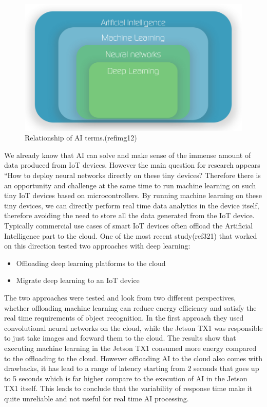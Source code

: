 \begin{figure}[!htb]
    \centering
    \includegraphics[width=1\textwidth]{figures/ai_classification.png}
    \caption{Relationship of AI terms.(refimg12)}
    \label{fig:ai_terms}
\end{figure}
We already know that AI can solve and make sense of the immense amount of data produced from IoT devices. However the main question for research appears “How to deploy neural networks directly on these tiny devices? Therefore there is an opportunity and challenge at the same time to run machine learning on such tiny IoT devices based on microcontrollers. By running machine learning on these tiny devices, we can directly perform real time data analytics in the device itself, therefore avoiding the need to store all the data generated from the IoT device. Typically commercial use cases of smart IoT devices often offload the Artificial Intelligence part to the cloud. 
One of the most recent study(ref321) that worked on this direction tested two approaches with deep learning: 
\begin{itemize}
    \item Offloading deep learning platforms to the cloud
    \item Migrate deep learning to an IoT device
\end{itemize}

The two approaches were tested and look from two different perspectives,  whether offloading machine learning can reduce energy efficiency and satisfy the real time requirements of object recognition. 
In the first approach they used convolutional neural networks on the cloud, while the Jetson TX1 was responsible to just take images and forward them to the cloud. The results show that executing machine learning in the Jetson TX1 consumed more energy compared to the offloading to the cloud. However offloading AI to the cloud also comes with drawbacks, it has lead to a range of latency starting from 2 seconds that goes up to 5 seconds which is far higher compare to the execution of AI in the Jetson TX1 itself. This leads to conclude that the variability of response time make it quite unreliable and not useful for real time AI processing. 

